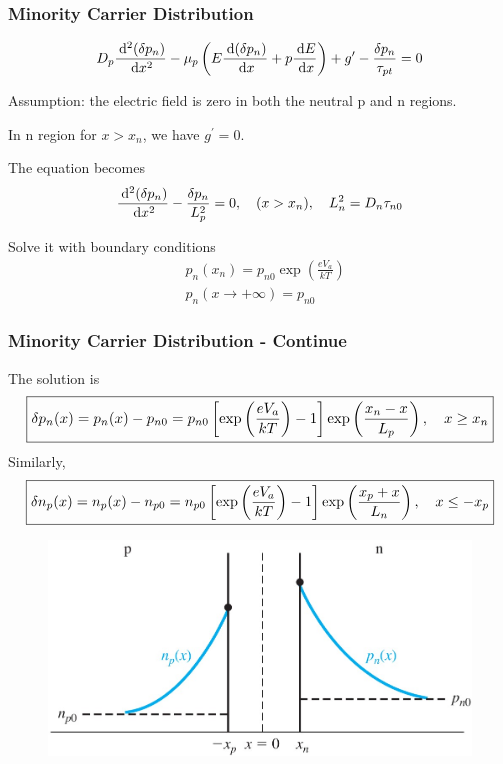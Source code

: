 \documentclass{beamer}
\begin{document}
    \begin{frame} \frametitle{Minority Carrier Distribution}
        \begin{equation*}
            D_p \frac{\: \mathrm{d}^2 (\delta p_n)}{\: \mathrm{d} x^2} - \mu_p \left( E \frac{\: \mathrm{d} (\delta p_n)}{\: \mathrm{d} x} + p \frac{\: \mathrm{d} E}{\: \mathrm{d} x}  \right) + g^\prime- \frac{\delta p_n}{\tau_{pt}} = 0
        \end{equation*}
        \par Assumption: the electric field is zero in both the neutral p and n regions.
        \par In n region for $x > x_n$, we have $g^\prime = 0$.
        \par The equation becomes
        \begin{equation*}
            \frac{\: \mathrm{d} ^2 (\delta p_n)}{\: \mathrm{d} x^2} - \frac{\delta p_n}{L^2_p} = 0, \quad (x > x_n), \quad L_n^2 = D_n \tau_{n0} 
        \end{equation*}
        \par Solve it with boundary conditions
        \begin{equation*}
            \begin{aligned}
                & p_n(x_n) = p_{n0} \exp \left( \frac{eV_a}{kT}  \right)  \\
                & p_n (x \to +\infty) = p_{n0} 
            \end{aligned}
        \end{equation*}
    \end{frame}
    \begin{frame} \frametitle{Minority Carrier Distribution - Continue}
        The solution is
        \begin{equation*}
            \resizebox*{\textwidth}{!}{
                \boxed{\delta p_n(x) = p_n(x) - p_{n0} = p_{n0} \left[ \exp\left( \dfrac{eV_a}{kT} \right) - 1\right] \exp\left( \dfrac{x_n - x}{L_p}  \right), \quad x \ge x_n}
            }
        \end{equation*}
        Similarly,
        \begin{equation*}
            \resizebox*{\textwidth}{!}{
                \boxed{\delta n_p(x) = n_p(x) - n_{p0} = n_{p0} \left[ \exp\left( \dfrac{eV_a}{kT}  \right) - 1 \right] \exp \left( \dfrac{x_p + x}{L_n}  \right), \quad x \le - x_p}
            }
        \end{equation*}
        \begin{figure}[H]
            \centering
            \includegraphics[width=0.6\linewidth]{Forward-biased-solution.jpg}
            \label{fig:Forward-biased-solution.jpg}
        \end{figure}
    \end{frame}
\end{document}
